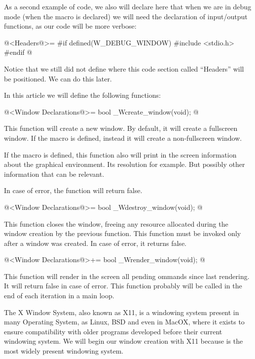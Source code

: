 As a second example of code, we also will declare here that when we
are in debug mode (when the macro  is
declared) we will need the declaration of input/output functions, as
our code will be more verbose:

\iniciocodigo
@<Headers@>=
#if defined(W_DEBUG_WINDOW)
#include <stdio.h>
#endif
@
\fimcodigo

Notice that we still did not define where this code section called
``Headers'' will be positioned. We can do this later.


In this article we will define the following functions:

\iniciocodigo
@<Window Declarations@>=
bool _Wcreate_window(void);
@
\fimcodigo

This function will create a new window. By default, it will create a
fullscreen window. If the macro 
is defined, instead it will create a non-fullscreen window.

If the macro  is defined, this function
also will print in the screen information about the graphical
environment. Its resolution for example. But possibly other
information that can be relevant.

In case of error, the function will return false.

\iniciocodigo
@<Window Declarations@>=
bool _Wdestroy_window(void);
@
\fimcodigo

This function closes the window, freeing any resource allocated during
the window creation by the previous function. This function must be
invoked only after a window was created. In case of error, it returns
false.

\iniciocodigo
@<Window Declarations@>+=
bool _Wrender_window(void);
@
\fimcodigo

This function will render in the screen all pending ommands since last
rendering. It will return false in case of error. This function
probably will be called in the end of each iteration in a main loop.




The X Window System, also known as X11, is a windowing system present
in many Operating System, as Linux, BSD and even in MacOX, where it
exists to ensure compatibility with older programs developed before
their current windowing system. We will begin our window creation with
X11 because is the most widely present windowing system.

